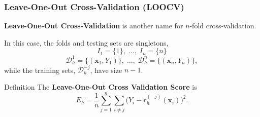 \documentclass[xcolor={dvipsnames}]{beamer}
\renewcommand{\hat}{\widehat}
\newcommand{\cD}{\mathcal{D}}
\newcommand{\vx}{\mathbf{x}}
\begin{document}
\begin{frame}
    \frametitle{Leave-One-Out Cross-Validation (LOOCV)}
    \setlength\parskip{0.75em}

    \textbf{Leave-One-Out Cross-Validation} is another name for $n$-fold cross-validation.

    In this case, the folds and testing sets are singletons,
    \[
        I_1=\{1\},\;\ldots,\; I_n=\{n\}
    \]
    \[
        \cD_h^1=\{(\vx_1,Y_1)\},\;\ldots,\; \cD_h^n=\{(\vx_n,Y_n)\},
    \]
    while the training sets, $\cD_h^{-j}$, have size $n-1$.

    \begin{block}{Definition}
        The \textbf{Leave-One-Out Cross Validation Score} is
        \[
           E_h = \frac1n\sum_{j=1}^n\sum_{i\neq j}\big(Y_i - r_h^{(-j)}(\vx_i)\big)^2.
        \]
    \end{block}

\end{frame}



\end{document}

